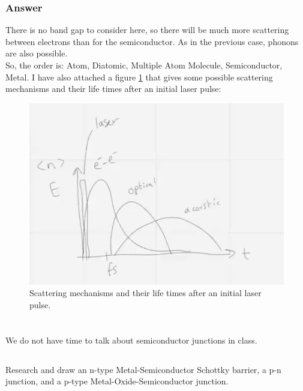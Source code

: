 \documentclass[12pt]{article}
\begin{document}
\subsubsection{Answer}
There is no band gap to consider here, so there will be much more scattering between electrons than for the semiconductor. As in the previous case, phonons are also possible.\\
So, the order is: Atom, Diatomic, Multiple Atom Molecule, Semiconductor, Metal.
I have also attached a figure \ref{fig:scattering} that gives some possible scattering mechanisms and their life times after an initial laser pulse:
\begin{figure}[h]
\centering
\includegraphics[width=\textwidth]{scattering.png}
\caption{Scattering mechanisms and their life times after an initial laser pulse.}
\label{fig:scattering}
\end{figure}
\newpage

\section{}

We do not have time to talk about semiconductor junctions in class.
\subsection{}
Research and draw an n-type Metal-Semiconductor Schottky barrier, a p-n junction, and a p-type Metal-Oxide-Semiconductor junction. 
\end{document}
